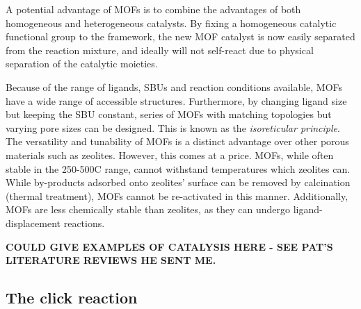 \documentclass[12pt,a4paper]{article}
\begin{document}
A potential advantage of MOFs is to combine the advantages of both homogeneous and heterogeneous catalysts. By fixing a homogeneous catalytic functional group to the framework, the new MOF catalyst is now easily separated from the reaction mixture, and ideally will not self-react due to physical separation of the catalytic moieties.

Because of the range of ligands, SBUs and reaction conditions available, MOFs have a wide range of accessible structures. Furthermore, by changing ligand size but keeping the SBU constant, series of MOFs with matching topologies but varying pore sizes can be designed.\cite{furukawa2013chemistry} This is known as the \emph{isoreticular principle}. The versatility and tunability of MOFs is a distinct advantage over other porous materials such as zeolites. However, this comes at a price. MOFs, while often stable in the 250-500\degree C range\cite{furukawa2013chemistry}, cannot withstand temperatures which zeolites can. While by-products adsorbed onto zeolites' surface can be removed by calcination (thermal treatment), MOFs cannot be re-activated in this manner\cite{gascon2013metal}. Additionally, MOFs are less chemically stable than zeolites, as they can undergo ligand-displacement reactions\cite{furukawa2013chemistry}.

\textbf{COULD GIVE EXAMPLES OF CATALYSIS HERE - SEE PAT'S LITERATURE REVIEWS HE SENT ME.}

\subsection{The click reaction}\label{sec:click}
\end{document}
